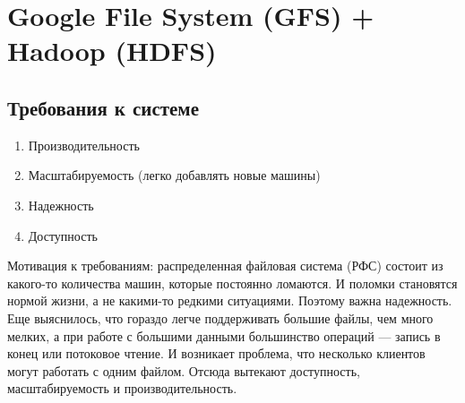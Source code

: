 \section{Google File System (GFS) + Hadoop (HDFS)}
    \subsection{Требования к системе}

    \begin{enumerate}
        \item Производительность
        \item Масштабируемость (легко добавлять новые машины)
        \item Надежность
        \item Доступность
    \end{enumerate}
    \quad Мотивация к требованиям: распределенная файловая система (РФС) состоит из какого-то количества машин, которые постоянно ломаются. И поломки становятся нормой жизни, а не какими-то редкими ситуациями. Поэтому важна надежность. Еще выяснилось, что гораздо легче поддерживать большие файлы, чем много мелких, а при работе с большими данными большинство операций --- запись в конец или потоковое чтение. И возникает проблема, что несколько клиентов могут работать с одним файлом. Отсюда вытекают доступность, масштабируемость и производительность.
    
